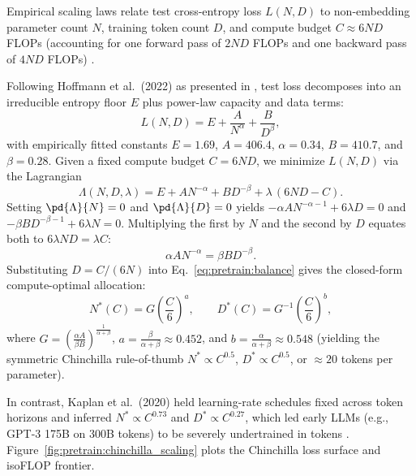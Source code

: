 \documentclass[../../../../master.tex]{subfiles}
\begin{document}
Empirical scaling laws relate test cross-entropy loss $L(N, D)$ to non-embedding parameter count $N$, training token count $D$, and compute budget $C \approx 6ND$ FLOPs (accounting for one forward pass of $2ND$ FLOPs and one backward pass of $4ND$ FLOPs) .

\begin{coremath}
Following Hoffmann et al.\ (2022) as presented in , test loss decomposes into an irreducible entropy floor $E$ plus power-law capacity and data terms:
\begin{equation}
  L(N, D) = E + \frac{A}{N^\alpha} + \frac{B}{D^\beta},
  \label{eq:pretrain:chinchilla_loss}
\end{equation}
with empirically fitted constants $E = 1.69$, $A = 406.4$, $\alpha = 0.34$, $B = 410.7$, and $\beta = 0.28$. Given a fixed compute budget $C = 6ND$, we minimize $L(N,D)$ via the Lagrangian
\begin{equation}
  \Lambda(N, D, \lambda) = E + A N^{-\alpha} + B D^{-\beta} + \lambda\,(6ND - C).
  \label{eq:pretrain:lagrangian}
\end{equation}
Setting $\pd{\Lambda}{N} = 0$ and $\pd{\Lambda}{D} = 0$ yields $-\alpha A N^{-\alpha-1} + 6\lambda D = 0$ and $-\beta B D^{-\beta-1} + 6\lambda N = 0$. Multiplying the first by $N$ and the second by $D$ equates both to $6\lambda ND = \lambda C$:
\begin{equation}
  \alpha A N^{-\alpha} = \beta B D^{-\beta}.
  \label{eq:pretrain:balance}
\end{equation}
Substituting $D = C/(6N)$ into Eq.~\eqref{eq:pretrain:balance} gives the closed-form compute-optimal allocation:
\begin{equation}
  N^*(C) = G \left(\frac{C}{6}\right)^{a}, \qquad
  D^*(C) = G^{-1} \left(\frac{C}{6}\right)^{b},
  \label{eq:pretrain:optimal_alloc}
\end{equation}
where $G = \left(\frac{\alpha A}{\beta B}\right)^{\frac{1}{\alpha+\beta}}$, $a = \frac{\beta}{\alpha+\beta} \approx 0.452$, and $b = \frac{\alpha}{\alpha+\beta} \approx 0.548$ (yielding the symmetric Chinchilla rule-of-thumb $N^* \propto C^{0.5}$, $D^* \propto C^{0.5}$, or $\approx 20$ tokens per parameter).
\end{coremath}

In contrast, Kaplan et al.\ (2020) held learning-rate schedules fixed across token horizons and inferred $N^* \propto C^{0.73}$ and $D^* \propto C^{0.27}$, which led early LLMs (e.g., GPT-3 175B on 300B tokens) to be severely undertrained in tokens . Figure~\ref{fig:pretrain:chinchilla_scaling} plots the Chinchilla loss surface and isoFLOP frontier.
\end{document}
